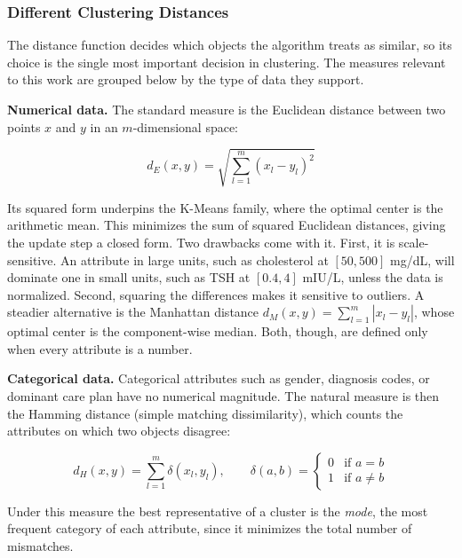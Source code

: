 \subsubsection*{Different Clustering Distances}

The distance function decides which objects the algorithm treats as similar, so its choice is the single most important decision in clustering. The measures relevant to this work are grouped below by the type of data they support.

\textbf{Numerical data.} The standard measure is the Euclidean distance between two points $x$ and $y$ in an $m$-dimensional space:

\begin{equation}
    d_E(x, y) = \sqrt{\sum_{l=1}^{m} (x_l - y_l)^2}
    \label{eq:euclidean}
\end{equation}

Its squared form underpins the K-Means family, where the optimal center is the arithmetic mean. This minimizes the sum of squared Euclidean distances, giving the update step a closed form. Two drawbacks come with it. First, it is scale-sensitive. An attribute in large units, such as cholesterol at $[50, 500]$ mg/dL, will dominate one in small units, such as TSH at $[0.4, 4]$ mIU/L, unless the data is normalized. Second, squaring the differences makes it sensitive to outliers. A steadier alternative is the Manhattan distance $d_M(x, y) = \sum_{l=1}^{m} |x_l - y_l|$, whose optimal center is the component-wise median. Both, though, are defined only when every attribute is a number.

\textbf{Categorical data.} Categorical attributes such as gender, diagnosis codes, or dominant care plan have no numerical magnitude. The natural measure is then the Hamming distance (simple matching dissimilarity), which counts the attributes on which two objects disagree:

\begin{equation}
    d_H(x, y) = \sum_{l=1}^{m} \delta(x_l, y_l), \qquad
    \delta(a, b) =
    \begin{cases}
        0 & \text{if } a = b \\
        1 & \text{if } a \neq b
    \end{cases}
    \label{eq:hamming}
\end{equation}

Under this measure the best representative of a cluster is the \emph{mode}, the most frequent category of each attribute, since it minimizes the total number of mismatches.

